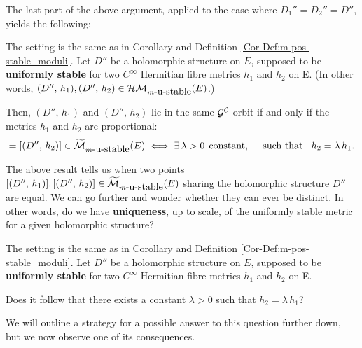 \documentclass[12pt]{article}
\begin{document}
\vspace{2ex}

The last part of the above argument, applied to the case where $D_1'' = D_2'' = D''$, yields the following:

\begin{Cor}\label{Cor:pairs_same-orbit_condition} The setting is the same as in Corollary and Definition \ref{Cor-Def:m-pos-stable_moduli}. Let $D''$ be a holomorphic structure on $E$, supposed to be {\bf uniformly stable} for two $C^\infty$ Hermitian fibre metrics $h_1$ and $h_2$ on E. (In other words, $(D'',\,h_1), (D'',\,h_2)\in{\cal HM}_{m\mbox{-u-stable}}(E)$.)

  \vspace{1ex}

  Then, $(D'',\,h_1)$ and $(D'',\,h_2)$ lie in the same ${\cal G}^{\cal C}$-orbit
if and only if the metrics $h_1$ and $h_2$ are proportional: \begin{eqnarray*}[(D'',\,h_1)] = [(D'',\,h_2)]\in\widetilde{\cal M}_{m\mbox{-u-stable}}(E) \iff \exists\, \lambda>0 \hspace{1ex} \mbox{constant, \hspace{2ex} such that} \hspace{2ex} h_2 = \lambda\,h_1.\end{eqnarray*}

\end{Cor}  


\vspace{2ex}

The above result tells us when two points $[(D'',\,h_1)], [(D'',\,h_2)]\in\widetilde{\cal M}_{m\mbox{-u-stable}}(E)$ sharing the holomorphic structure $D''$ are equal. We can go further and wonder whether they can ever be distinct. In other words, do we have {\bf uniqueness}, up to scale, of the uniformly stable metric for a given holomorphic structure?

\begin{Question}\label{Question:uniqueness_unif-stable-metrics} The setting is the same as in Corollary and Definition \ref{Cor-Def:m-pos-stable_moduli}. Let $D''$ be a holomorphic structure on $E$, supposed to be {\bf uniformly stable} for two $C^\infty$ Hermitian fibre metrics $h_1$ and $h_2$ on E.

  Does it follow that there exists a constant $\lambda>0$ such that $h_2 = \lambda\,h_1$?


\end{Question}  


We will outline a strategy for a possible answer to this question further down, but we now observe one of its consequences.
\end{document}
